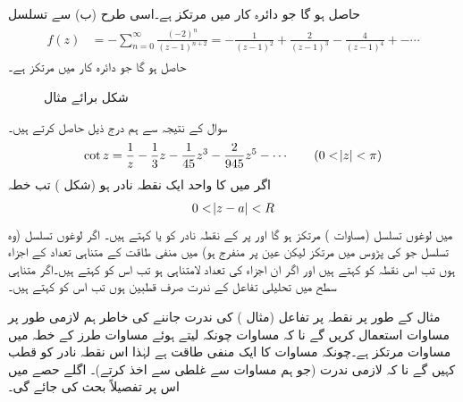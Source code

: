 حاصل ہو گا جو دائرہ کار  میں مرتکز ہے۔اسی طرح (ب) سے تسلسل
\begin{gather}
\begin{aligned}\label{مساوات_ٹیلر_چھلا_دوسرا}
f(z)&=-\sum\limits_{n=0}^{\infty} \frac{(-2)^n}{(z-1)^{n+2}}=-\frac{1}{(z-1)^2}+\frac{2}{(z-1)^3}-\frac{4}{(z-1)^4}+-\cdots
\end{aligned}
\end{gather} 
حاصل ہو گا جو دائرہ کار  میں مرتکز ہے۔
%
\begin{figure}
\centering
{}
\caption{شکل برائے مثال }
\label{شکل_مثال_ٹیلر_لوغوں_مثال_ب}
\end{figure}
\quad 
سوال  کے نتیجہ  سے ہم درج ذیل حاصل کرتے ہیں۔
\begin{align*}
\cot z=\frac{1}{z}-\frac{1}{3}z-\frac{1}{45}z^3-\frac{2}{945}z^5-\cdots\quad \quad (0<\abs{z}<\pi)
\end{align*}
اگر  میں   کا واحد ایک نقطہ نادر  ہو (شکل ) تب خطہ
\begin{align}\label{مساوات_ٹیلر_قطب_خطہ}
0<\abs{z-a}<R
\end{align}
میں لوغوں تسلسل (مساوات ) مرتکز ہو گا اور  پر  کے نقطہ نادر کو  یا  کہتے ہیں۔ اگر لوغوں تسلسل (وہ تسلسل جو  کی پڑوس میں مرتکز لیکن عین  پر منفرج ہو) میں منفی طاقت  کے متناہی  تعداد کے اجزاء ہوں تب اس نقطہ کو  کہتے ہیں اور اگر ان اجزاء کی تعداد لامتناہی ہو تب اس کو  کہتے ہیں۔اگر متناہی سطح میں تحلیلی تفاعل کے ندرت صرف قطبین ہوں تب اس کو  کہتے ہیں۔

مثال کے طور پر نقطہ  پر تفاعل  (مثال ) کی ندرت جاننے کی خاطر ہم لازمی طور پر  مساوات  استعمال کریں گے نا کہ مساوات  چونکہ  لیتے ہوئے مساوات  طرز کے خطہ  میں  مساوات  مرتکز ہے۔چونکہ مساوات  کا ایک منفی طاقت ہے لہٰذا اس نقطہ نادر کو قطب کہیں گے نا کہ لازمی ندرت (جو ہم مساوات  سے غلطی سے اخذ کرتے)۔ اگلے حصے میں اس پر تفصیلاً بحث کی جائے گی۔

